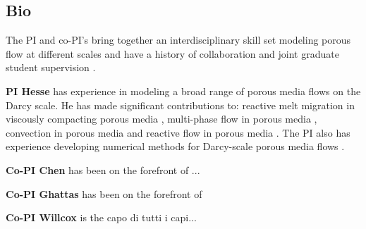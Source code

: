 \documentclass[11pt,final]{article}%
\begin{document}
\subsection{Bio}
The PI and co-PI's bring together an interdisciplinary skill set modeling porous flow at different scales and have a history of collaboration and joint graduate student supervision \cite{Ghanbarzadeh2014,Ghanbarzadeh2015a,Ghanbarzadeh2015b,Ghanbarzadeh2017}.

\textbf{PI Hesse} has experience in modeling a broad range of porous media flows on the Darcy scale. He has made significant contributions to: reactive melt migration in viscously compacting porous media \cite{Hesse2003,Liang2010a,Liang2011b,Hesse2011,Schiemenz2011,Jordan2015,Arbogast2017,Jordan2018}, multi-phase flow in porous media \cite{Hesse2007,Hesse2008,Hesse2010,Golding2011,Sathaye2016b}, convection in porous media \cite{Riaz2006,Neufeld2010,MacMinn2012,Szulczewski2013a,Sathaye2014,Woods2015} and reactive flow in porous media \cite{Prigiobbe2012a,Prigiobbe2012b,Prigiobbe2013,Venkatraman2014,McNeece2016}. The PI also has experience developing numerical methods for Darcy-scale porous media flows \cite{Li2005,Hesse2008b,Schiemenz2011,Hesse2012,Hesse2014,Arbogast2017}.

\textbf{Co-PI Chen} has been on the forefront of ...

\textbf{Co-PI Ghattas} has been on the forefront of

\textbf{Co-PI Willcox} is the capo di tutti i capi...
\end{document}
